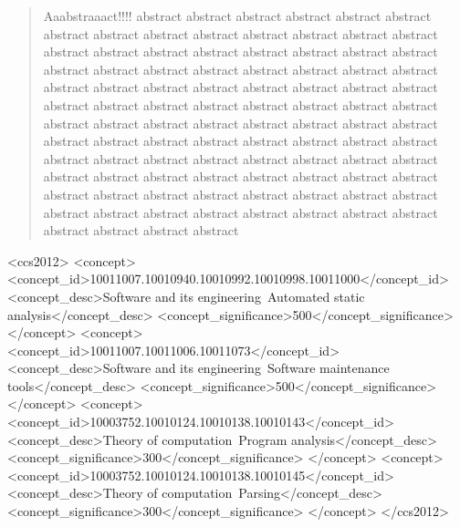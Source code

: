 \documentclass{sig-alternate-05-2015}
\begin{document}
\maketitle

\begin{abstract}

Aaabstraaact!!!! abstract abstract abstract abstract abstract abstract abstract abstract abstract abstract
 abstract abstract abstract abstract abstract abstract abstract abstract
  abstract abstract abstract abstract abstract abstract abstract abstract 
   abstract abstract abstract abstract abstract abstract abstract abstract
    abstract abstract abstract abstract abstract abstract abstract abstract
     abstract abstract abstract abstract abstract abstract abstract abstract
      abstract abstract abstract abstract abstract abstract abstract abstract 
       abstract abstract abstract abstract abstract abstract abstract abstract
        abstract abstract abstract abstract abstract abstract abstract abstract
         abstract abstract abstract abstract abstract abstract abstract abstract
          abstract abstract abstract abstract abstract abstract abstract abstract
           abstract abstract abstract abstract abstract abstract abstract abstract

\end{abstract}

\begin{CCSXML}
<ccs2012>
    <concept>
        <concept_id>10011007.10010940.10010992.10010998.10011000</concept_id>
        <concept_desc>Software and its engineering~Automated static analysis</concept_desc>
        <concept_significance>500</concept_significance>
    </concept>
    <concept>
        <concept_id>10011007.10011006.10011073</concept_id>
        <concept_desc>Software and its engineering~Software maintenance tools</concept_desc>
        <concept_significance>500</concept_significance>
    </concept>
    <concept>
        <concept_id>10003752.10010124.10010138.10010143</concept_id>
        <concept_desc>Theory of computation~Program analysis</concept_desc>
        <concept_significance>300</concept_significance>
    </concept>
    <concept>
        <concept_id>10003752.10010124.10010138.10010145</concept_id>
        <concept_desc>Theory of computation~Parsing</concept_desc>
        <concept_significance>300</concept_significance>
    </concept>
</ccs2012>
\end{CCSXML}


\printccsdesc












\balancecolumns
\end{document}

